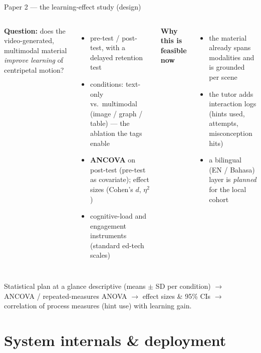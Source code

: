 \documentclass[aspectratio=169,10pt]{beamer}
\begin{document}
\begin{frame}{Paper 2 --- the learning-effect study (design)}
\small
\begin{columns}[T]
\textbf{Question:} does the video-generated, multimodal material \emph{improve learning} of centripetal motion?
\begin{itemize}\setlength\itemsep{2pt}
  \item pre-test / post-test, with a delayed retention test
  \item conditions: text-only vs.\ multimodal (image / graph / table) --- the ablation the tags enable
  \item \textbf{ANCOVA} on post-test (pre-test as covariate); effect sizes (Cohen's $d$, $\eta^2$)
  \item cognitive-load and engagement instruments (standard ed-tech scales)
\end{itemize}
\textbf{Why this is feasible now}
\begin{itemize}\setlength\itemsep{2pt}
  \item the material already spans modalities and is grounded per scene
  \item the tutor adds interaction logs (hints used, attempts, misconception hits)
  \item a bilingual (EN / Bahasa) layer is \emph{planned} for the local cohort
\end{itemize}
\end{columns}
\vspace{0.4em}
\begin{block}{\small Statistical plan at a glance}
{\small descriptive (means $\pm$ SD per condition) $\to$ ANCOVA / repeated-measures ANOVA $\to$
effect sizes \& 95\% CIs $\to$ correlation of process measures (hint use) with learning gain.}
\end{block}
\end{frame}

\section{System internals \& deployment}
\end{document}
